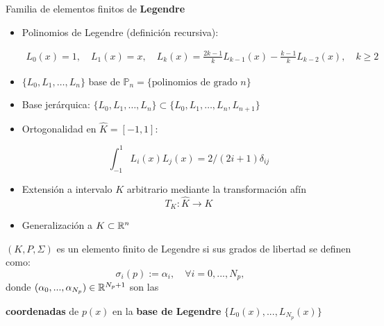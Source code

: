 \documentclass[9pt,leqno]{beamer}
\newcommand{\Np}{{N_p}}
\newcommand{\refelem}{\widehat}
\begin{document}
\begin{frame}{Familia de elementos finitos de \textbf{Legendre}}
  \small
  \begin{itemize}
  \item Polinomios de Legendre (definición recursiva):
    \begin{footnotesize}
      \begin{align*}
        L_0(x)=1, \quad L_1(x)=x,
        \quad L_{k}(x) = \frac{2k-1}k L_{k-1}(x) - \frac{k-1}{k} L_{k-2}(x), \quad k\ge 2
      \end{align*}
    \end{footnotesize}
  \item $\{L_0,L_1,\dots,L_n\}$ base de
    $\mathbb{P}_n=\{\text{polinomios de grado } n\}$
  \item \alert{Base jerárquica}:
    $\{L_0,L_1,\dots,L_n\} \subset \{L_0,L_1,\dots,L_n, L_{n+1}\}$
  \item \alert{Ortogonalidad} en $\refelem K=[-1,1]$:
    \begin{footnotesize}
      $$\int_{-1}^1 L_i(x) L_j(x) = 2/(2i+1)\delta_{ij}$$
    \end{footnotesize}
  \item Extensión a intervalo $K$ arbitrario mediante la transformación afín
    $$T_K : \refelem K \to K$$
  \item Generalización a $K\subset{\mathbb R}^n$~\cite{solin_higher-order_2004}
  \end{itemize}
  \vspace{-0.3em}
  \normalsize
  \begin{definition} $(K,P,\Sigma)$ es un \alert{elemento finito de
      Legendre} si sus grados de libertad se definen como:
    $$
    \sigma_i(p) := \alpha_i, \quad \forall i=0,...,\Np,
    $$
    donde $(\alpha_0,...,\alpha_\Np) \in\Rset^{\Np+1}$ son las
    \vspace{-0.3em}
    \begin{center}
      \textbf{coordenadas} de $p(x)$ en la \textbf{base de Legendre}
      $\{L_0(x),...,L_\Np(x)\}$
    \end{center}
  \end{definition}

\end{frame}
\end{document}
